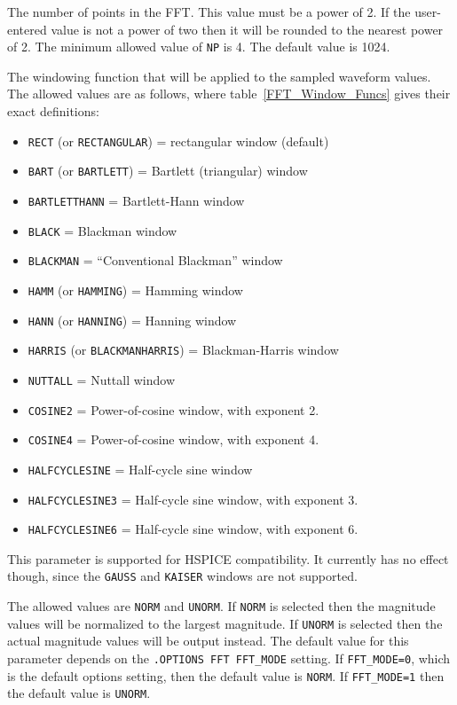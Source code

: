 \begin{Command}
\begin {Arguments}
The number of points in the FFT.  This value must be a power of 2.  If
the user-entered value is not a power of two then it will be rounded to
the nearest power of 2.  The minimum allowed value of {\tt NP} is 4.
The default value is 1024.

The windowing function that will be applied to the sampled waveform
values.  The allowed values are as follows, where table~\ref{FFT_Window_Funcs}
gives their exact definitions:

\begin{itemize}
  \item \texttt{RECT} (or \texttt{RECTANGULAR}) = rectangular window (default)
  \item \texttt{BART} (or \texttt{BARTLETT}) = Bartlett (triangular) window
  \item \texttt{BARTLETTHANN} = Bartlett-Hann window
  \item \texttt{BLACK} = Blackman window
  \item \texttt{BLACKMAN} = ``Conventional Blackman'' window
  \item \texttt{HAMM} (or \texttt{HAMMING}) = Hamming window
  \item \texttt{HANN} (or \texttt{HANNING}) = Hanning window
  \item \texttt{HARRIS} (or \texttt{BLACKMANHARRIS}) = Blackman-Harris window
  \item \texttt{NUTTALL} = Nuttall window
  \item \texttt{COSINE2} = Power-of-cosine window, with exponent 2.
  \item \texttt{COSINE4} = Power-of-cosine window, with exponent 4.
  \item \texttt{HALFCYCLESINE} = Half-cycle sine window
  \item \texttt{HALFCYCLESINE3} = Half-cycle sine window, with exponent 3.
  \item \texttt{HALFCYCLESINE6} = Half-cycle sine window, with exponent 6.
\end{itemize}

This parameter is supported for HSPICE compatibility. It currently
has no effect though, since the {\tt GAUSS} and {\tt KAISER} windows
are not supported.

The allowed values are {\tt NORM} and {\tt UNORM}.  If {\tt NORM} is
selected then the magnitude values will be normalized to the largest
magnitude.  If {\tt UNORM} is selected then the actual magnitude values
will be output instead.  The default value for this parameter depends
on the \texttt{.OPTIONS FFT FFT\_MODE} setting.  If \texttt{FFT\_MODE=0},
which is the default options setting, then the default value is {\tt NORM}.
If \texttt{FFT\_MODE=1} then the default value is {\tt UNORM}.


\end{Arguments}
\end{Command}
